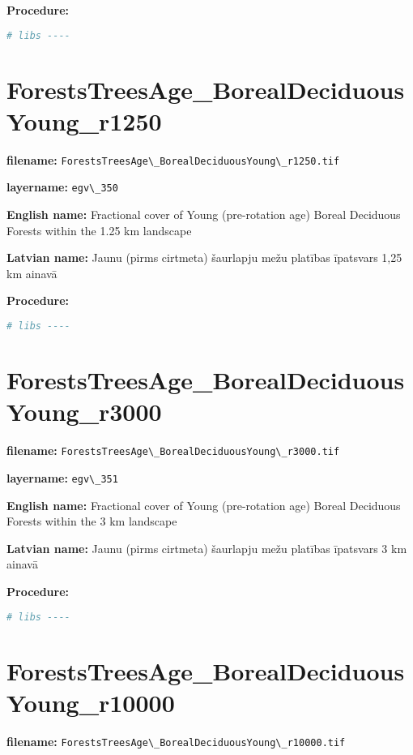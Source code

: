\documentclass[
]{book}
\newcommand{\passthrough}[1]{#1}
\begin{document}
\textbf{Procedure:}

\begin{lstlisting}[language=R]
# libs ----
\end{lstlisting}

\section{ForestsTreesAge\_BorealDeciduousYoung\_r1250}\label{ch06.350}

\textbf{filename:} \passthrough{\lstinline!ForestsTreesAge\_BorealDeciduousYoung\_r1250.tif!}

\textbf{layername:} \passthrough{\lstinline!egv\_350!}

\textbf{English name:} Fractional cover of Young (pre-rotation age) Boreal Deciduous Forests within the 1.25 km landscape

\textbf{Latvian name:} Jaunu (pirms cirtmeta) šaurlapju mežu platības īpatsvars 1,25 km ainavā

\textbf{Procedure:}

\begin{lstlisting}[language=R]
# libs ----
\end{lstlisting}

\section{ForestsTreesAge\_BorealDeciduousYoung\_r3000}\label{ch06.351}

\textbf{filename:} \passthrough{\lstinline!ForestsTreesAge\_BorealDeciduousYoung\_r3000.tif!}

\textbf{layername:} \passthrough{\lstinline!egv\_351!}

\textbf{English name:} Fractional cover of Young (pre-rotation age) Boreal Deciduous Forests within the 3 km landscape

\textbf{Latvian name:} Jaunu (pirms cirtmeta) šaurlapju mežu platības īpatsvars 3 km ainavā

\textbf{Procedure:}

\begin{lstlisting}[language=R]
# libs ----
\end{lstlisting}

\section{ForestsTreesAge\_BorealDeciduousYoung\_r10000}\label{ch06.352}

\textbf{filename:} \passthrough{\lstinline!ForestsTreesAge\_BorealDeciduousYoung\_r10000.tif!}
\end{document}
